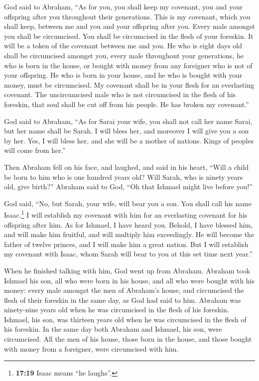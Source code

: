  God said to Abraham, ``As for you, you shall keep my
covenant, you and your offspring after you throughout their generations.
 This is my covenant, which you shall keep, between me
and you and your offspring after you. Every male amongst you shall be
circumcised.  You shall be circumcised in the flesh of
your foreskin. It will be a token of the covenant between me and you.
 He who is eight days old shall be circumcised amongst
you, every male throughout your generations, he who is born in the
house, or bought with money from any foreigner who is not of your
offspring.  He who is born in your house, and he who is
bought with your money, must be circumcised. My covenant shall be in
your flesh for an everlasting covenant.  The
uncircumcised male who is not circumcised in the flesh of his foreskin,
that soul shall be cut off from his people. He has broken my covenant.''

 God said to Abraham, ``As for Sarai your wife, you shall
not call her name Sarai, but her name shall be Sarah.  I
will bless her, and moreover I will give you a son by her. Yes, I will
bless her, and she will be a mother of nations. Kings of peoples will
come from her.''

 Then Abraham fell on his face, and laughed, and said in
his heart, ``Will a child be born to him who is one hundred years old?
Will Sarah, who is ninety years old, give birth?'' 
Abraham said to God, ``Oh that Ishmael might live before you!''

 God said, ``No, but Sarah, your wife, will bear you a
son. You shall call his name Isaac.\footnote{\textbf{17:19} Isaac means
  ``he laughs''.} I will establish my covenant with him for an
everlasting covenant for his offspring after him.  As for
Ishmael, I have heard you. Behold, I have blessed him, and will make him
fruitful, and will multiply him exceedingly. He will become the father
of twelve princes, and I will make him a great nation. 
But I will establish my covenant with Isaac, whom Sarah will bear to you
at this set time next year.''

 When he finished talking with him, God went up from
Abraham.  Abraham took Ishmael his son, all who were born
in his house, and all who were bought with his money: every male amongst
the men of Abraham's house, and circumcised the flesh of their foreskin
in the same day, as God had said to him.  Abraham was
ninety-nine years old when he was circumcised in the flesh of his
foreskin.  Ishmael, his son, was thirteen years old when
he was circumcised in the flesh of his foreskin.  In the
same day both Abraham and Ishmael, his son, were circumcised.
 All the men of his house, those born in the house, and
those bought with money from a foreigner, were circumcised with him.

